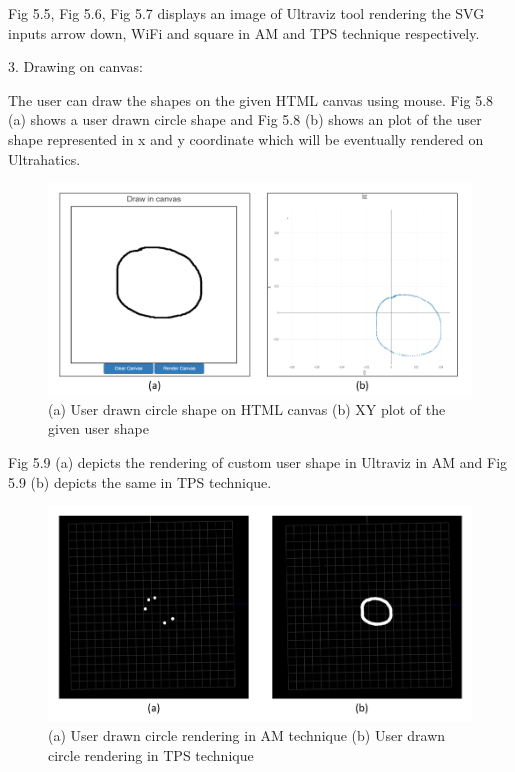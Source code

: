 Fig 5.5, Fig 5.6, Fig 5.7 displays an image of Ultraviz tool rendering the SVG inputs arrow down, WiFi and square in AM and TPS technique respectively.

3. Drawing on canvas:

The user can draw the shapes on the given HTML canvas using mouse. Fig 5.8 (a) shows a user drawn circle shape and Fig 5.8 (b) shows an plot of the user shape represented in x and y coordinate which will be eventually rendered on Ultrahatics.

\begin{figure}[H]
	\includegraphics[width=\textwidth]{gfx/canvas input.png}
	\caption{(a) User drawn circle shape on HTML canvas (b) XY plot of the given user shape}
	\label{fig:validation:svg_sq_tps}
\end{figure}

Fig 5.9 (a) depicts the rendering of custom user shape in Ultraviz in AM and Fig 5.9 (b) depicts the same in TPS technique.

\begin{figure}[H]
	\includegraphics[width=\textwidth]{gfx/canvas_uv.png}
	\caption{(a) User drawn circle rendering in AM technique (b) User drawn circle rendering in TPS technique}
	\label{fig:validation:svg_sq_tps}
\end{figure}

